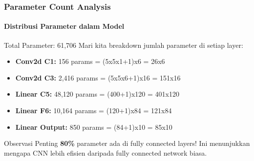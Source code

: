 \documentclass[t,aspectratio=169,xcolor=dvipsnames]{beamer}
\begin{document}
\begin{frame}
    \frametitle{Parameter Count Analysis}
    \framesubtitle{Distribusi Parameter dalam Model}
    \small

    \begin{block}{Total Parameter: 61,706}
        Mari kita breakdown jumlah parameter di setiap layer:
    \end{block}

    \begin{itemize}
        \item \textbf{Conv2d C1:} 156 params = (5x5x1+1)x6 = 26x6
        \item \textbf{Conv2d C3:} 2,416 params = (5x5x6+1)x16 = 151x16
        \item \textbf{Linear C5:} 48,120 params = (400+1)x120 = 401x120
        \item \textbf{Linear F6:} 10,164 params = (120+1)x84 = 121x84
        \item \textbf{Linear Output:} 850 params = (84+1)x10 = 85x10
    \end{itemize}

    \begin{alertblock}{Observasi Penting}
        \textbf{80\%} parameter ada di fully connected layers! Ini menunjukkan mengapa CNN lebih efisien daripada fully connected network biasa.
    \end{alertblock}

\end{frame}
\end{document}
